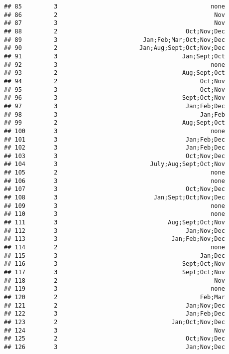 \documentclass[
]{article}
\begin{document}
\begin{verbatim}
## 85         3                                           none
## 86         2                                            Nov
## 87         3                                            Nov
## 88         2                                    Oct;Nov;Dec
## 89         3                        Jan;Feb;Mar;Oct;Nov;Dec
## 90         2                       Jan;Aug;Sept;Oct;Nov;Dec
## 91         3                                   Jan;Sept;Oct
## 92         3                                           none
## 93         2                                   Aug;Sept;Oct
## 94         2                                        Oct;Nov
## 95         3                                        Oct;Nov
## 96         3                                   Sept;Oct;Nov
## 97         3                                    Jan;Feb;Dec
## 98         3                                        Jan;Feb
## 99         2                                   Aug;Sept;Oct
## 100        3                                           none
## 101        3                                    Jan;Feb;Dec
## 102        3                                    Jan;Feb;Dec
## 103        3                                    Oct;Nov;Dec
## 104        3                          July;Aug;Sept;Oct;Nov
## 105        2                                           none
## 106        3                                           none
## 107        3                                    Oct;Nov;Dec
## 108        3                           Jan;Sept;Oct;Nov;Dec
## 109        3                                           none
## 110        3                                           none
## 111        3                               Aug;Sept;Oct;Nov
## 112        3                                    Jan;Nov;Dec
## 113        3                                Jan;Feb;Nov;Dec
## 114        2                                           none
## 115        3                                        Jan;Dec
## 116        3                                   Sept;Oct;Nov
## 117        3                                   Sept;Oct;Nov
## 118        2                                            Nov
## 119        3                                           none
## 120        2                                        Feb;Mar
## 121        2                                    Jan;Nov;Dec
## 122        3                                    Jan;Feb;Dec
## 123        2                                Jan;Oct;Nov;Dec
## 124        3                                            Nov
## 125        2                                    Oct;Nov;Dec
## 126        3                                    Jan;Nov;Dec

\end{verbatim}
\end{document}
